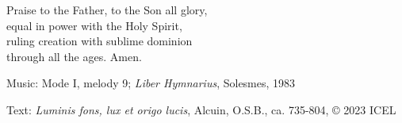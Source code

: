 \hymn



\begin{underhymnverse}
Praise to the Father, to the Son all glory,\\
equal in power with the Holy Spirit,\\
ruling creation with sublime dominion\\
through all the ages. Amen.
\end{underhymnverse}

\begin{hymnsource}
Music: Mode I, melody 9; \emph{Liber Hymnarius}, Solesmes, 1983

Text: \emph{Luminis fons, lux et origo lucis}, Alcuin, O.S.B., ca. 735-804, © 2023 ICEL
\end{hymnsource}
